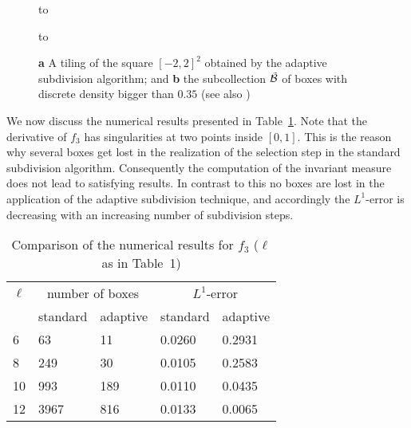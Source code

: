 \documentclass[cvs,envcountsect]{svjour}
\begin{document}
\begin{itemize}
\begin{figure*}
\vbox{\hbox to}
\label{fig:stahl}
\end{figure*}

\begin{figure*}
\vbox{\hbox to}
\caption[]{{\bf a} A tiling of the square $[-2,2]^2$ obtained by the
           adaptive subdivision algorithm; and {\bf b} the subcollection
           $\tilde{\cB}$ of boxes with discrete density bigger than
           $0.35$ (see also \protect{})}
\label{fig:henon}
\end{figure*}

We now discuss the numerical results presented in Table~\ref{tab:stahl}.
Note that the derivative of $f_3$ has singularities at two points
inside $[0,1]$.  This is the reason why several boxes get lost in
the realization of the selection step in the standard subdivision
algorithm.  Consequently the computation of the invariant measure
does not lead to satisfying results.  In contrast to this no boxes are lost
in the application of the adaptive subdivision technique, and accordingly
the $L^1$-error is decreasing with an increasing number of subdivision steps.

\begin{table}
\caption[]{Comparison of the numerical results for $f_3$
           ($\ell$ as in Table~1)}
\label{tab:stahl}
\begin{tabular}{ l l l l l }
\hline
$\ell$ &
\multicolumn{2}{c}{number of boxes} & \multicolumn{2}{c}{$L^1$-error} \\
  & standard & adaptive & standard & adaptive \\ \hline
6  &   63 &  11 & 0.0260 & 0.2931 \\
8  &  249 &  30 & 0.0105 & 0.2583 \\
10 &  993 & 189 & 0.0110 & 0.0435 \\
12 & 3967 & 816 & 0.0133 & 0.0065 \\ \hline
\end{tabular}
\end{table}
\end{itemize}
\end{document}
